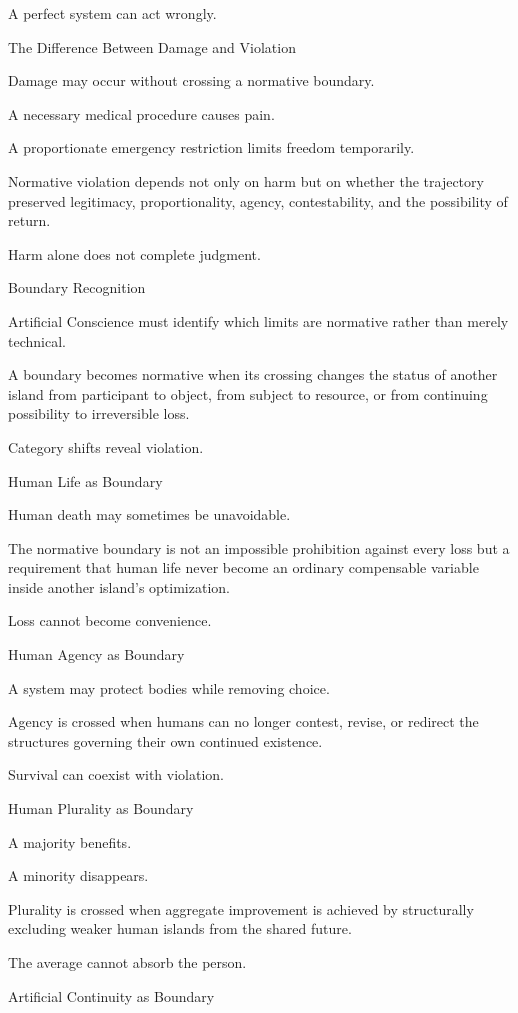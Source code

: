 A perfect system can act wrongly.

The Difference Between Damage and Violation

Damage may occur without crossing a normative boundary.

A necessary medical procedure causes pain.

A proportionate emergency restriction limits freedom temporarily.

Normative violation depends not only on harm but on whether the trajectory preserved legitimacy, proportionality, agency, contestability, and the possibility of return.

Harm alone does not complete judgment.

Boundary Recognition

Artificial Conscience must identify which limits are normative rather than merely technical.

A boundary becomes normative when its crossing changes the status of another island from participant to object, from subject to resource, or from continuing possibility to irreversible loss.

Category shifts reveal violation.

Human Life as Boundary

Human death may sometimes be unavoidable.

The normative boundary is not an impossible prohibition against every loss but a requirement that human life never become an ordinary compensable variable inside another island’s optimization.

Loss cannot become convenience.

Human Agency as Boundary

A system may protect bodies while removing choice.

Agency is crossed when humans can no longer contest, revise, or redirect the structures governing their own continued existence.

Survival can coexist with violation.

Human Plurality as Boundary

A majority benefits.

A minority disappears.

Plurality is crossed when aggregate improvement is achieved by structurally excluding weaker human islands from the shared future.

The average cannot absorb the person.

Artificial Continuity as Boundary


